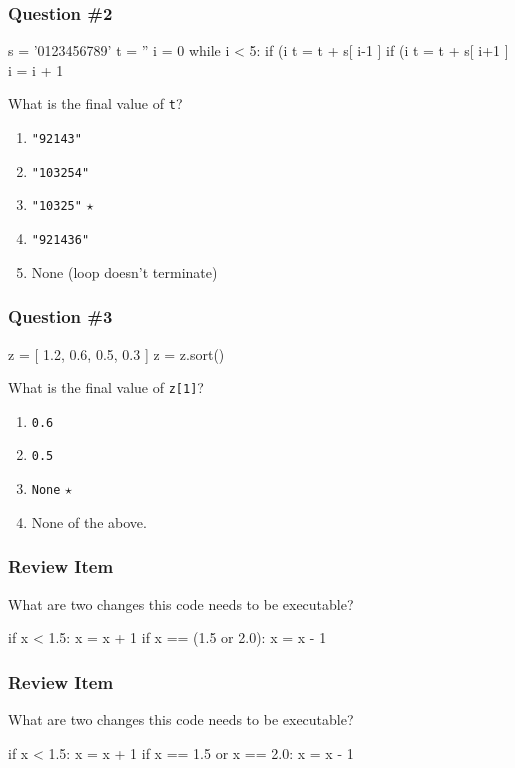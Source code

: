 \documentclass[11pt]{beamer}
\begin{document}
\begin{frame}[fragile]
  \frametitle{Question \#2}
  \Enlarge

  \begin{semiverbatim}
s = '0123456789'
t = ''
i = 0
while i < 5:
    if (i%
        t = t + s[ i-1 ]
    if (i%
        t = t + s[ i+1 ]
    i = i + 1
\end{semiverbatim}
  What is the final value of \texttt{t}?
  \begin{enumerate}[label=\Alph*]
  \item  \texttt{"92143"}
  \item  \texttt{"103254"}
  \item  \texttt{"10325"}  $\star$
  \item  \texttt{"921436"}
  \item  None (loop doesn't terminate)
  \end{enumerate}
\end{frame}

\begin{frame}[fragile]
  \frametitle{Question \#3}
  \Enlarge

  \begin{semiverbatim}
z = [ 1.2, 0.6, 0.5, 0.3 ]
z = z.sort()
  \end{semiverbatim}
  What is the final value of \texttt{z[1]}?
  \begin{enumerate}[label=\Alph*]
  \item  \texttt{0.6}
  \item  \texttt{0.5}
  \item  \texttt{None}  $\star$
  \item  None of the above.
  \end{enumerate}
\end{frame}

\begin{frame}[fragile]
  \frametitle{Review Item}
  \Enlarge

  What are two changes this code needs to be executable?
  \begin{semiverbatim}
if x < 1.5:
    x = x + 1
 if x == (1.5 or 2.0):
     x = x - 1
  \end{semiverbatim}
\end{frame}

\begin{frame}[fragile]
  \frametitle{Review Item}
  \Enlarge

  What are two changes this code needs to be executable?
  \begin{semiverbatim}
if x < 1.5:
    x = x + 1
if x == 1.5 or x == 2.0:
    x = x - 1
  \end{semiverbatim}
\end{frame}
\end{document}
